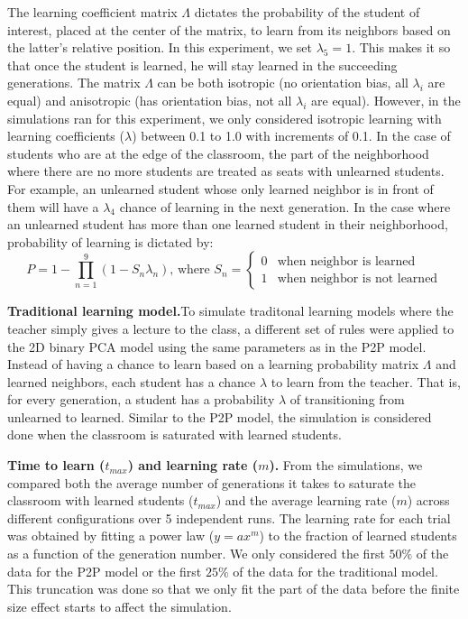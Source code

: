 \documentclass[10pt,a4paper,twoside]{article}
\begin{document}
\noindent The learning coefficient matrix $\Lambda$ dictates the probability of the student of interest, placed at the center of the matrix, to learn from its neighbors based on the latter's relative position. In this experiment, we set $\lambda_5 = 1$. This makes it so that once the student is learned, he will stay learned in the succeeding generations. The matrix $\Lambda$ can be both isotropic (no orientation bias, all $\lambda_i$ are equal) and anisotropic (has orientation bias, not all $\lambda_i$ are equal). However, in the simulations ran for this experiment, we only considered isotropic learning with learning coefficients ($\lambda$) between 0.1 to 1.0 with increments of 0.1.  In the case of students who are at the edge of the classroom, the part of the neighborhood where there are no more students are treated as seats with unlearned students. For example, an unlearned student whose only learned neighbor is in front of them will have a $\lambda_4$ chance of learning in the next generation. In the case where an unlearned student has more than one learned student in their neighborhood, probability of learning is dictated by:
\begin{equation}
  P = 1 - \prod_{n=1}^{9}{(1-S_n\lambda_n)}
  \text{, where } S_n=
  \begin{cases}
    0 & \text{when neighbor is learned}\\
    1 & \text{when neighbor is not learned}
  \end{cases}
  \label{eq:learning probability}
\end{equation}

\noindent \textbf{Traditional learning model.}To simulate traditonal learning models where the teacher simply gives a lecture to the class, a different set of rules were applied to the 2D binary PCA model using the same parameters as in the P2P model. Instead of having a chance to learn based on a learning probability matrix $\Lambda$ and learned neighbors, each student has a chance $\lambda$ to learn from the teacher. That is, for every generation, a student has a probability $\lambda$ of transitioning from unlearned to learned. Similar to the P2P model, the simulation is considered done when the classroom is saturated with learned students.

\noindent \textbf{Time to learn ($t_{max}$) and learning rate ($m$).} From the simulations, we compared both the average number of generations it takes to saturate the classroom with learned students ($t_{max}$) and the average learning rate ($m$) across different configurations over 5 independent runs. The learning rate for each trial was obtained by fitting a power law ($y = ax^m$) to the fraction of learned students as a function of the generation number. We only considered the first $50\%$ of the data for the P2P model or the first $25\%$ of the data for the traditional model. This truncation was done so that we only fit the part of the data before the finite size effect starts to affect the simulation. %
\end{document}

